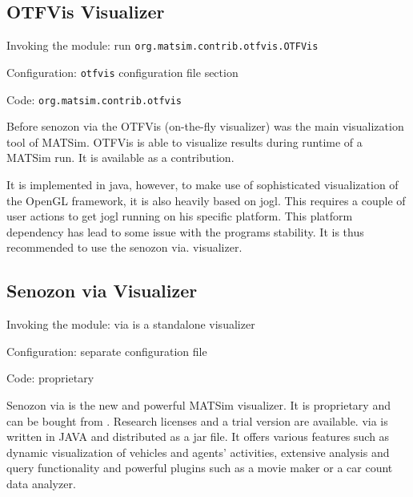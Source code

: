 \subsection{OTFVis Visualizer}
\label{sec:OTFVis}
\begin{compactitem}
\item Invoking the module: run \lstinline|org.matsim.contrib.otfvis.OTFVis|
\item Configuration: \lstinline|otfvis| configuration file section
\item Code: \lstinline|org.matsim.contrib.otfvis|
\end{compactitem}

Before senozon via the OTFVis (on-the-fly visualizer) \citep[][]{Strippgen_PhDThesis_2009} was the main visualization tool of MATSim. OTFVis is able to visualize results during runtime of a MATSim run. It is available as a contribution.

It is implemented in java, however, to make use of sophisticated visualization of the OpenGL framework, it is also heavily based on jogl. This requires a couple of user actions to get jogl running on his specific platform. This platform dependency has lead to some issue with the programs stability. It is thus recommended to use the senozon via. visualizer.
\subsection{Senozon via Visualizer}
\label{sec:via}
\begin{compactitem}
\item Invoking the module: via is a standalone visualizer
\item Configuration: separate configuration file
\item Code: proprietary
\end{compactitem}

Senozon via is the new and powerful MATSim visualizer. It is proprietary and can be bought from \citep[][]{senozonVIA_Webpage_2014}. Research licenses and a trial version are available. via is written in JAVA and distributed as a jar file. It offers various features such as dynamic visualization of vehicles and agents' activities, extensive analysis and query functionality and powerful plugins such as a movie maker or a car count data analyzer.

